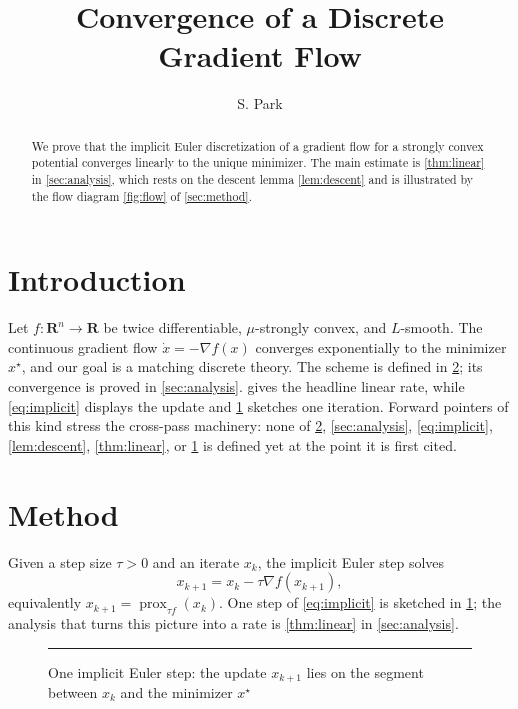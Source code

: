 \documentclass[11pt]{amsart}
\title{Convergence of a Discrete Gradient Flow}
\author{S. Park}
\date{}
\theoremstyle{plain}
\begin{document}
\begin{abstract}
We prove that the implicit Euler discretization of a gradient flow for a
strongly convex potential converges linearly to the unique minimizer.
The main estimate is \cref{thm:linear} in \cref{sec:analysis}, which rests on
the descent lemma \cref{lem:descent} and is illustrated by the flow diagram
\cref{fig:flow} of \cref{sec:method}.
\end{abstract}
\maketitle

\section{Introduction}
\label{sec:intro}

Let $f \colon \mathbf{R}^n \to \mathbf{R}$ be twice differentiable,
$\mu$-strongly convex, and $L$-smooth. The continuous gradient flow
$\dot x = -\nabla f(x)$ converges exponentially to the minimizer
$x^\star$, and our goal is a matching discrete theory. The scheme is defined
in \cref{sec:method}; its convergence is proved in \cref{sec:analysis}.
 gives the headline linear rate, while
\cref{eq:implicit} displays the update and \cref{fig:flow} sketches one
iteration. Forward pointers of this kind stress the cross-pass machinery:
none of \cref{sec:method}, \cref{sec:analysis}, \cref{eq:implicit},
\cref{lem:descent}, \cref{thm:linear}, or \cref{fig:flow} is defined yet at
the point it is first cited.

\section{Method}
\label{sec:method}

Given a step size $\tau > 0$ and an iterate $x_k$, the implicit Euler step
solves
\begin{equation}
  \label{eq:implicit}
  x_{k+1} = x_k - \tau \nabla f(x_{k+1}),
\end{equation}
equivalently $x_{k+1} = \operatorname{prox}_{\tau f}(x_k)$. One step of
\cref{eq:implicit} is sketched in \cref{fig:flow}; the analysis that turns
this picture into a rate is \cref{thm:linear} in \cref{sec:analysis}.

\begin{figure}[ht]
  \centering
  \rule{0.7\textwidth}{2.5cm}
  \caption{One implicit Euler step: the update $x_{k+1}$ lies on the segment
    between $x_k$ and the minimizer $x^\star$}
  \label{fig:flow}
\end{figure}
\end{document}
